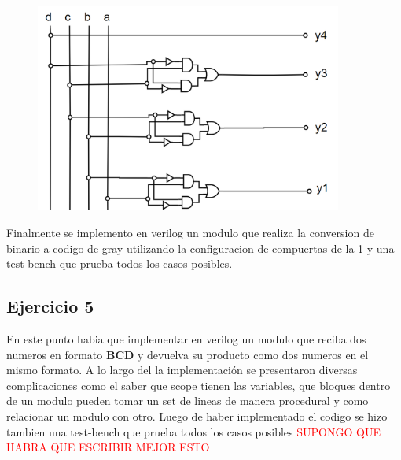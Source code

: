 \documentclass[a4paper]{article}
\begin{document}
\begin{figure}[H]
	\centering
	\includegraphics[width=0.9\textwidth]{Circuito3.PNG}
	\label{fig:circ3}
\end{figure}
Finalmente se implemento en verilog un modulo que realiza la conversion de binario a codigo de gray utilizando la configuracion de compuertas de la \ref{fig:circ3}
y una test bench que prueba todos los casos posibles.
\subsection*{Ejercicio 5}
En este punto habia que implementar en verilog un modulo que reciba dos numeros en formato \textbf{BCD} y devuelva su producto como dos numeros en el mismo formato.
A lo largo del la implementación se presentaron diversas complicaciones  como el saber que scope tienen las variables, que bloques dentro de un modulo pueden tomar un set de lineas de manera procedural y como relacionar un modulo con otro.
Luego de haber implementado el codigo se hizo tambien una test-bench que prueba todos los casos posibles
\center \textcolor{red}{SUPONGO QUE HABRA QUE ESCRIBIR MEJOR ESTO}
\end{document}
